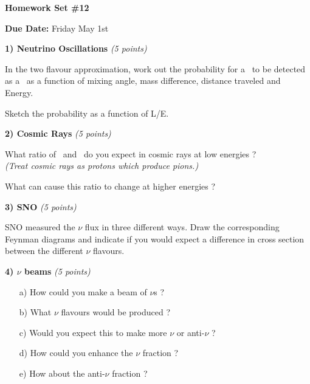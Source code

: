 


\thispagestyle{fancy}






\begin{center}
{\huge \textbf{Homework Set \#12 }}
\large

{\textbf{ Due Date:} Friday May 1st  } 
\end{center}

{\large

\textbf{1) Neutrino Oscillations } \hfill \textit{(5 points)}

In the two flavour approximation, work out the probability for a \nue\ to be detected as a \numu\ as a function of mixing angle, mass difference, distance traveled and Energy. 

Sketch the probability as a function of L/E. 

\vspace*{0.25in}



\textbf{2) Cosmic Rays } \hfill \textit{(5 points)}

What ratio of \nue\ and \numu\ do you expect in cosmic rays at low energies ?\\
\textit{(Treat cosmic rays as protons which produce pions.) }

What can cause this ratio to change at higher energies ?

\vspace*{0.25in}

\textbf{3) SNO } \hfill \textit{(5 points)}

SNO measured the $\nu$ flux in three different ways.
Draw the corresponding Feynman diagrams and indicate if you would expect a difference in cross section between the different $\nu$ flavours. 

\vspace*{0.25in}

\textbf{4) $\nu$ beams } \hfill \textit{(5 points)}

\begin{itemize}
\item[a)]How could you make a beam of $\nu$s ? 
\item[b)]What $\nu$ flavours would be produced ? 
\item[c)]Would you expect this to make more $\nu$ or anti-$\nu$ ? 
\item[d)]How could you enhance the $\nu$ fraction ? 
\item[e)]How about the  anti-$\nu$ fraction ?
\end{itemize}

}

